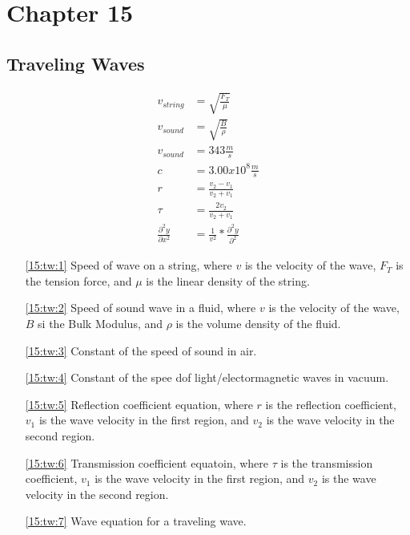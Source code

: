 \documentclass{subfile}
\begin{document}
\section{Chapter 15}

\subsection{Traveling Waves}

\begin{align}
	v_{string} &= \sqrt{\frac{F_{T}}{\mu}} \label{15:tw:1}\\
	v_{sound} &= \sqrt{\frac{B}{\rho}} \label{15:tw:2}\\
	v_{sound} &= 343\frac{m}{s} \label{15:tw:3}\\
	c &= 3.00x10^{8}\frac{m}{s} \label{15:tw:4}\\
	r &= \frac{v_{2} - v_{1}}{v_{2} + v_{1}} \label{15:tw:5}\\
	\tau &= \frac{2v_{2}}{v_{2} + v_{1}} \label{15:tw:6}\\
	\frac{\partial^{2}y}{\partial x^{2}} &= \frac{1}{v^{2}} * \frac{\partial^{2}y}{\partial^{2}} \label{15:tw:7}
\end{align}

\begin{enumerate}
	\item[\eqref{15:tw:1}] Speed of wave on a string, where $v$ is the velocity of the wave, $F_{T}$ is the tension force, and $\mu$ is the linear density of the string.
	\item[\eqref{15:tw:2}] Speed of sound wave in a fluid, where $v$ is the velocity of the wave, $B$ si the Bulk Modulus,  and $\rho$ is the volume density of the fluid.
	\item[\eqref{15:tw:3}] Constant of the speed of sound in air.
	\item[\eqref{15:tw:4}] Constant of the spee dof light/electormagnetic waves in vacuum.
	\item[\eqref{15:tw:5}] Reflection coefficient equation, where $r$ is the reflection coefficient, $v_{1}$ is the wave velocity in the first region, and $v_{2}$ is the wave velocity in the second region.
	\item[\eqref{15:tw:6}] Transmission coefficient equatoin, where $\tau$ is the transmission coefficient, $v_{1}$ is the wave velocity in the first region, and $v_{2}$ is the wave velocity in the second region.
	\item[\eqref{15:tw:7}] Wave equation for a traveling wave.
\end{enumerate}
\end{document}
